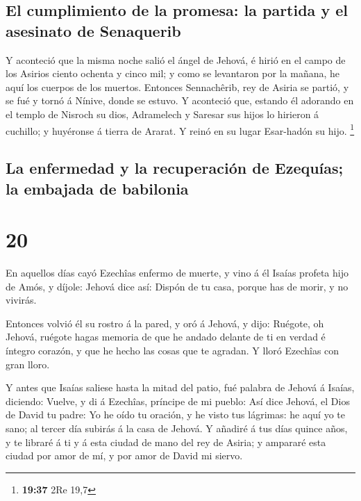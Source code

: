 \hypertarget{el-cumplimiento-de-la-promesa-la-partida-y-el-asesinato-de-senaquerib}{%
\subsection{El cumplimiento de la promesa: la partida y el asesinato de
Senaquerib}\label{el-cumplimiento-de-la-promesa-la-partida-y-el-asesinato-de-senaquerib}}

 Y aconteció que la misma noche salió el ángel de Jehová, é
hirió en el campo de los Asirios ciento ochenta y cinco mil; y como se
levantaron por la mañana, he aquí los cuerpos de los muertos.
 Entonces Sennachêrib, rey de Asiria se partió, y se fué y
tornó á Nínive, donde se estuvo.  Y aconteció que, estando
él adorando en el templo de Nisroch su dios, Adramelech y Saresar sus
hijos lo hirieron á cuchillo; y huyéronse á tierra de Ararat. Y reinó en
su lugar Esar-hadón su hijo. \footnote{\textbf{19:37} 2Re 19,7}

\hypertarget{la-enfermedad-y-la-recuperaciuxf3n-de-ezequuxedas-la-embajada-de-babilonia}{%
\subsection{La enfermedad y la recuperación de Ezequías; la embajada de
babilonia}\label{la-enfermedad-y-la-recuperaciuxf3n-de-ezequuxedas-la-embajada-de-babilonia}}

\hypertarget{section-19}{%
\section{20}\label{section-19}}

 En aquellos días cayó Ezechîas enfermo de muerte, y vino á
él Isaías profeta hijo de Amós, y díjole: Jehová dice así: Dispón de tu
casa, porque has de morir, y no vivirás.

 Entonces volvió él su rostro á la pared, y oró á Jehová, y
dijo:  Ruégote, oh Jehová, ruégote hagas memoria de que he
andado delante de ti en verdad é íntegro corazón, y que he hecho las
cosas que te agradan. Y lloró Ezechîas con gran lloro.

 Y antes que Isaías saliese hasta la mitad del patio, fué
palabra de Jehová á Isaías, diciendo:  Vuelve, y di á
Ezechîas, príncipe de mi pueblo: Así dice Jehová, el Dios de David tu
padre: Yo he oído tu oración, y he visto tus lágrimas: he aquí yo te
sano; al tercer día subirás á la casa de Jehová.  Y añadiré
á tus días quince años, y te libraré á ti y á esta ciudad de mano del
rey de Asiria; y ampararé esta ciudad por amor de mí, y por amor de
David mi siervo.

